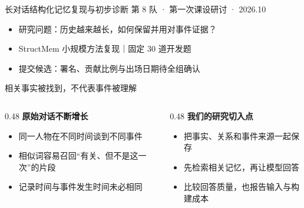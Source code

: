 \documentclass[aspectratio=169,10pt]{beamer}
\begin{document}
\begin{frame}{长对话结构化记忆复现与初步诊断}
\small
第 8 队 · 第一次课设研讨 · 2026.10\par\vspace{6mm}
\begin{itemize}
\item 研究问题：历史越来越长，如何保留并用对事件证据？\vspace{4mm}
\item StructMem 小规模方法复现｜固定 30 道开发题\vspace{4mm}
\item 提交候选：署名、贡献比例与出场日期待全组确认\vspace{4mm}
\end{itemize}
\end{frame}
\begin{frame}{相关事实被找到，不代表事件被理解}
\small
\begin{columns}[T]
\begin{column}{0.48\textwidth}
\textbf{原始对话不断增长}\par\vspace{3mm}
\begin{itemize}
\item 同一人物在不同时间谈到不同事件
\item 相似词容易召回“有关、但不是这一次”的片段
\item 记录时间与事件发生时间未必相同
\end{itemize}\end{column}
\begin{column}{0.48\textwidth}
\textbf{我们的研究切入点}\par\vspace{3mm}
\begin{itemize}
\item 把事实、关系和事件来源一起保存
\item 先检索相关记忆，再让模型回答
\item 比较回答质量，也报告输入与构建成本
\end{itemize}\end{column}
\end{columns}
\end{frame}
\end{document}
